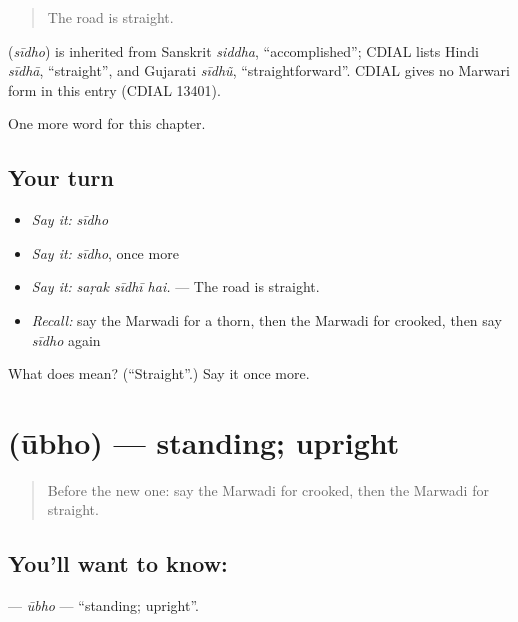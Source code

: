 \begin{quote}
The road is straight.
\end{quote}

\begin{cousinweb}
\textbf{} (\emph{sīdho}) is inherited from Sanskrit \emph{siddha}, \textquotedblleft{}accomplished\textquotedblright{}; CDIAL lists Hindi \emph{sīdhā}, \textquotedblleft{}straight\textquotedblright{}, and Gujarati \emph{sīdhũ}, \textquotedblleft{}straightforward\textquotedblright{}. CDIAL gives no Marwari form in this entry (CDIAL 13401).
\end{cousinweb}

\begin{grammarlens}[title={What you've built}]
One more word for this chapter.
\end{grammarlens}

\subsection*{Your turn}
\begin{itemize}
\raggedright
  \item \emph{Say it:} \emph{sīdho}
  \item \emph{Say it:} \emph{sīdho}, once more
  \item \emph{Say it:} \emph{saṛak sīdhī hai.} — The road is straight.
  \item \emph{Recall:} say the Marwadi for a thorn, then the Marwadi for crooked, then say \emph{sīdho} again
\end{itemize}

\begin{tcolorbox}[breakable,colback=teal!4,colframe=teal!35!black,title={Before you move on}]
What does  mean? (\textquotedblleft{}Straight\textquotedblright{}.) Say it once more.
\end{tcolorbox}
\section[\texorpdfstring{\mw{ऊभो} (ūbho)}{ऊभो (ūbho)}]{ (ūbho) — standing; upright}

\label{lesson:MW-C231-ubho}



\begin{quote}
Before the new one: say the Marwadi for crooked, then the Marwadi for straight.
\end{quote}

\subsection*{You'll want to know: }
\textbf{} — \emph{ūbho} — \textquotedblleft{}standing; upright\textquotedblright{}.

